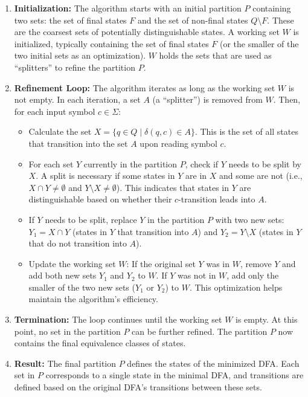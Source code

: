 \begin{enumerate}
    \item \textbf{Initialization:} The algorithm starts with an initial partition $P$ containing two sets: the set of final states $F$ and the set of non-final states $Q \setminus F$. These are the coarsest sets of potentially distinguishable states. A working set $W$ is initialized, typically containing the set of final states $F$ (or the smaller of the two initial sets as an optimization). $W$ holds the sets that are used as ``splitters'' to refine the partition $P$. 

    \item \textbf{Refinement Loop:} The algorithm iterates as long as the working set $W$ is not empty. In each iteration, a set $A$ (a ``splitter'') is removed from $W$. Then, for each input symbol $c \in \Sigma$:
        \begin{itemize}
            \item Calculate the set $X = \{q \in Q \mid \delta(q, c) \in A\}$. This is the set of all states that transition into the set $A$ upon reading symbol $c$.
            \item For each set $Y$ currently in the partition $P$, check if $Y$ needs to be split by $X$. A split is necessary if some states in $Y$ are in $X$ and some are not (i.e., $X \cap Y \neq \emptyset$ and $Y \setminus X \neq \emptyset$). This indicates that states in $Y$ are distinguishable based on whether their $c$-transition leads into $A$.
            \item If $Y$ needs to be split, replace $Y$ in the partition $P$ with two new sets: $Y_1 = X \cap Y$ (states in $Y$ that transition into $A$) and $Y_2 = Y \setminus X$ (states in $Y$ that do not transition into $A$).
            \item Update the working set $W$: If the original set $Y$ was in $W$, remove $Y$ and add both new sets $Y_1$ and $Y_2$ to $W$. If $Y$ was not in $W$, add only the smaller of the two new sets ($Y_1$ or $Y_2$) to $W$. This optimization helps maintain the algorithm's efficiency.
        \end{itemize}

    \item \textbf{Termination:} The loop continues until the working set $W$ is empty. At this point, no set in the partition $P$ can be further refined. The partition $P$ now contains the final equivalence classes of states.

    \item \textbf{Result:} The final partition $P$ defines the states of the minimized DFA. Each set in $P$ corresponds to a single state in the minimal DFA, and transitions are defined based on the original DFA's transitions between these sets.
\end{enumerate}

